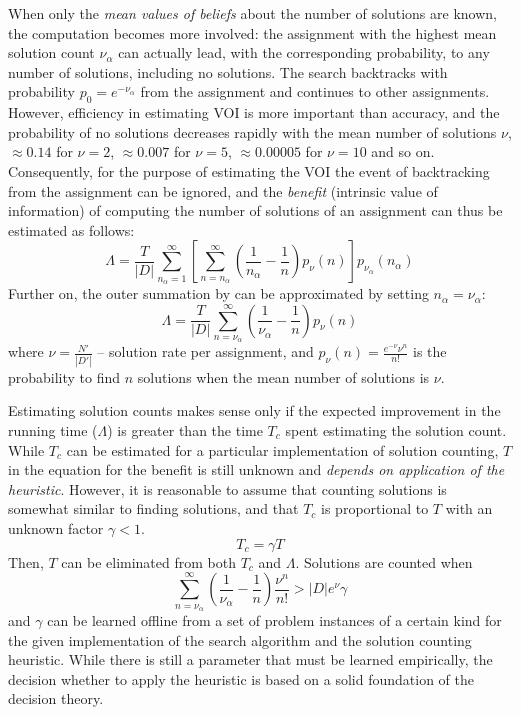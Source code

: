 When only the {\em mean values of beliefs} about the number of solutions are
known, the computation becomes more involved: the assignment with the
highest mean solution count $\nu_{\alpha}$ can actually lead, with the
corresponding probability, to any number of solutions, including no
solutions. The search backtracks with probability
$p_0=e^{-\nu_{\alpha}}$ from the assignment and continues to other
assignments. However, efficiency in estimating VOI is more important
than accuracy, and the probability of no solutions
decreases rapidly with the mean number of solutions $\nu$, $\approx 0.14$ for
$\nu=2$, $\approx 0.007$ for $\nu=5$, $\approx 0.00005$ for $\nu=10$
and so on. Consequently, for the purpose of estimating the VOI the
event of backtracking from the assignment can be ignored, and the
{\em benefit} (intrinsic value of information) of computing the number of
solutions of an assignment can thus be estimated as follows:
\begin{equation}
\label{eq:app-csp-lambda-simplified}
\Lambda = \frac T {|D|} \sum_{n_\alpha=1}^\infty\left[\sum_{n=n_\alpha}^\infty \left( \frac 1 {n_\alpha} - \frac 1 n\right) p_\nu(n)\right]p_{\nu_{\alpha}}(n_\alpha)
\end{equation}
Further on, the outer summation by can be approximated by setting $n_\alpha=\nu_\alpha$:
\begin{equation}
\label{eq:app-csp-lambda-simple}
\Lambda= \frac T {|D|} \sum_{n=\nu_\alpha}^\infty \left( \frac 1 {\nu_\alpha} - \frac 1 n\right) p_\nu(n)
\end{equation}
where $\nu=\frac {N'} {|D'|}$ -- solution rate per assignment, and
$p_\nu(n)=\frac {e^{-\nu}\nu^n} {n!}$ is the probability to find $n$
solutions when the mean number of solutions is  $\nu$.

Estimating solution counts makes sense only if the expected improvement in the
running time ($\Lambda$) is greater than the time $T_c$ spent
estimating the solution count. While $T_c$ can be estimated for a
particular implementation of solution counting, $T$ in the equation
for the benefit is still unknown and {\em depends on application of
the heuristic}. However, it is reasonable to assume that counting
solutions is somewhat similar to finding solutions, and that $T_c$ is
proportional to $T$ with an unknown factor $\gamma < 1$.
\begin{equation}
\label{eq:app-csp-gamma}
T_c = \gamma T
\end{equation}
Then, $T$ can be eliminated from both $T_c$ and $\Lambda$. Solutions
are counted when
\begin{equation}
\label{eq:app-csp-solcount-condition}
\sum_{n=\nu_\alpha}^\infty \left( \frac 1 {\nu_\alpha} - \frac 1 {n}\right) \frac {\nu^n} {n!} > {|D|}e^\nu \gamma
\end{equation}
and $\gamma$ can be learned offline from a set of problem instances of a certain kind
for the given implementation of the search algorithm and the solution
counting heuristic. While there is still a parameter that must be
learned empirically, the decision whether to apply the heuristic is
based on a solid foundation of the decision theory.

